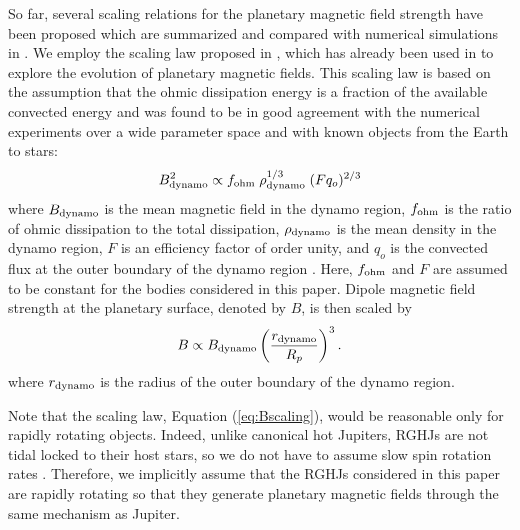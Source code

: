 \documentclass[iop,numberedappendix,apj]{emulateapj}
\begin{document}
So far, several scaling relations for the planetary magnetic field strength  
have been proposed \citep[e.g.][]{russel1978,busse1976,stevenson1979,mizutani1992,sano1993,starchenko2002,christensen2006,christensen_et_al2009}  
which are summarized and compared with numerical simulations in \citet{christensen2010}. 
We employ the scaling law proposed in \citet{christensen_et_al2009}, which has already been used in \citet{reiners2010} to explore the evolution of planetary magnetic fields.
This scaling law is based on the assumption that the ohmic dissipation energy is a fraction of the available convected energy and was found to be in good agreement with the numerical experiments over a wide parameter space and with known objects from the Earth to stars:
\begin{equation}
B_{\rm dynamo} ^2 \propto f_{\rm ohm}\;\rho_{\rm dynamo}^{1/3} \;  (Fq_o)^{2/3} \label{eq:Bscaling} 
\end{equation}
where $B_{\rm dynamo}$ is the mean magnetic field in the dynamo region, $f_{\rm ohm}$ is the ratio of ohmic dissipation to the total dissipation, $\rho_{\rm dynamo} $ is the mean density in the dynamo region, $F$ is an efficiency factor of order unity, and $q_o$ is the convected flux at the outer boundary of the dynamo region \citep[see][for the comprehensive description]{christensen_et_al2009}. 
Here, $f_{\rm ohm}$ and $F$ are assumed to be constant for the bodies considered in this paper. 
Dipole magnetic field strength at the planetary surface, denoted by $B$, is then scaled by
\begin{equation}
B \propto B_{\rm dynamo} \left( \frac{r_{\rm dynamo}}{R_p} \right)^3.  \label{eq:Bscaling2}
\end{equation}
where $r_{\rm dynamo}$ is the radius of the outer boundary of the dynamo region. 

Note that the scaling law, Equation (\ref{eq:Bscaling}), would be reasonable only for rapidly rotating objects.
Indeed, unlike canonical hot Jupiters, RGHJs are not tidal locked to their host stars, so we do not have to assume slow spin rotation rates \citep{spiegel+madhusudhan2012}.
Therefore, we implicitly assume that the RGHJs considered in this paper are rapidly rotating so that they generate planetary magnetic fields through the same mechanism as Jupiter. 
\end{document}
